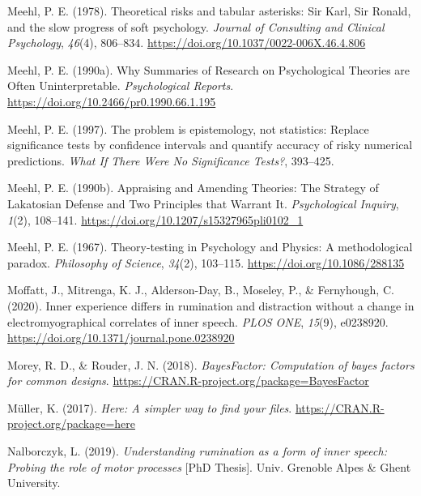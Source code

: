 \documentclass[
  english,
  man,floatsintext]{apa6}
\newlength{\cslhangindent}
\newenvironment{cslreferences}%
  {\setlength{\parindent}{0pt}%
  \everypar{\setlength{\hangindent}{\cslhangindent}}\ignorespaces}%
  {\par}
\begin{document}
\begin{cslreferences}
\leavevmode\hypertarget{ref-meehl_theoretical_1978}{}%
Meehl, P. E. (1978). Theoretical risks and tabular asterisks: Sir Karl, Sir Ronald, and the slow progress of soft psychology. \emph{Journal of Consulting and Clinical Psychology}, \emph{46}(4), 806--834. \url{https://doi.org/10.1037/0022-006X.46.4.806}

\leavevmode\hypertarget{ref-meehl_why_1990}{}%
Meehl, P. E. (1990a). Why Summaries of Research on Psychological Theories are Often Uninterpretable. \emph{Psychological Reports}. \url{https://doi.org/10.2466/pr0.1990.66.1.195}

\leavevmode\hypertarget{ref-harlow_problem_1997}{}%
Meehl, P. E. (1997). The problem is epistemology, not statistics: Replace significance tests by confidence intervals and quantify accuracy of risky numerical predictions. \emph{What If There Were No Significance Tests?}, 393--425.

\leavevmode\hypertarget{ref-meehl_appraising_1990-1}{}%
Meehl, P. E. (1990b). Appraising and Amending Theories: The Strategy of Lakatosian Defense and Two Principles that Warrant It. \emph{Psychological Inquiry}, \emph{1}(2), 108--141. \url{https://doi.org/10.1207/s15327965pli0102_1}

\leavevmode\hypertarget{ref-meehl_theory-testing_1967}{}%
Meehl, P. E. (1967). Theory-testing in Psychology and Physics: A methodological paradox. \emph{Philosophy of Science}, \emph{34}(2), 103--115. \url{https://doi.org/10.1086/288135}

\leavevmode\hypertarget{ref-moffatt_inner_2020}{}%
Moffatt, J., Mitrenga, K. J., Alderson-Day, B., Moseley, P., \& Fernyhough, C. (2020). Inner experience differs in rumination and distraction without a change in electromyographical correlates of inner speech. \emph{PLOS ONE}, \emph{15}(9), e0238920. \url{https://doi.org/10.1371/journal.pone.0238920}

\leavevmode\hypertarget{ref-R-BayesFactor}{}%
Morey, R. D., \& Rouder, J. N. (2018). \emph{BayesFactor: Computation of bayes factors for common designs}. \url{https://CRAN.R-project.org/package=BayesFactor}

\leavevmode\hypertarget{ref-R-here}{}%
Müller, K. (2017). \emph{Here: A simpler way to find your files}. \url{https://CRAN.R-project.org/package=here}

\leavevmode\hypertarget{ref-nalborczyk_understanding_2019}{}%
Nalborczyk, L. (2019). \emph{Understanding rumination as a form of inner speech: Probing the role of motor processes} {[}PhD Thesis{]}. Univ. Grenoble Alpes \& Ghent University.


\end{cslreferences}
\end{document}
